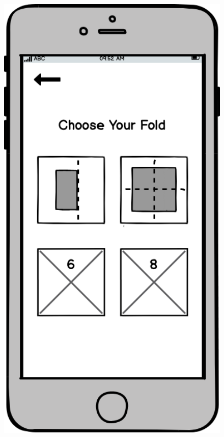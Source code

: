 \documentclass[11pt]{article}
\begin{document}
\begin{figure}
\begin{minipage}[c]{0.35\textwidth}
                \includegraphics[width=1\textwidth]{Images/Prototype/prototypeChooseFold.png}
                \end{minipage}
            \end{figure}
            
\end{document}
